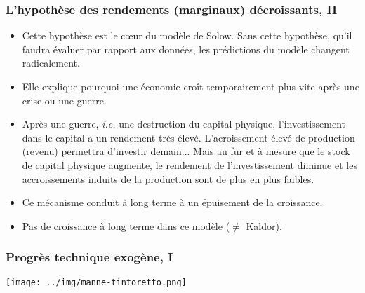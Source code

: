 \documentclass[10pt,notheorems]{beamer}
\theoremstyle{plain}
\theoremstyle{definition} %
\begin{document}
\begin{frame}
  \frametitle{L'hypothèse des rendements (marginaux) décroissants, II}

  \medskip

  \begin{itemize}

  \item Cette hypothèse est le c\oe{}ur du modèle de Solow. Sans cette
    hypothèse, qu'il faudra évaluer par rapport aux données, les
    prédictions du modèle changent radicalement.\newline

  \item Elle explique pourquoi une économie croît temporairement plus
    vite après une crise ou une guerre.\newline

  \item Après une guerre, \emph{i.e.} une destruction du capital
    physique, l'investissement dans le capital a un rendement très
    élevé. L'acroissement élevé de production (revenu) permettra
    d'investir demain... Mais au fur et à mesure que le stock de
    capital physique augmente, le rendement de l'investissement
    diminue et les accroissements induits de la production sont de
    plus en plus faibles.\newline

  \item Ce mécanisme conduit à long terme à un épuisement de la croissance.\newline

  \item Pas de croissance à long terme dans ce modèle ($\neq$ Kaldor).\newline

  \end{itemize}

\end{frame}


\begin{frame}
  \frametitle{Progrès technique exogène, I}

  \begin{center}
    \texttt{[image: ../img/manne-tintoretto.png]}
  \end{center}

\end{frame}
\end{document}
